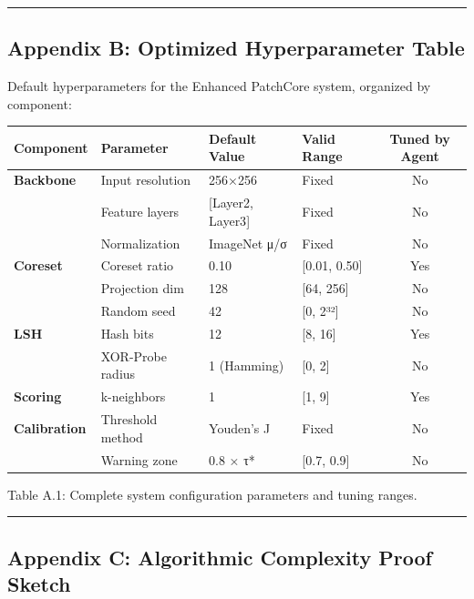 \begin{center}\rule{0.5\linewidth}{0.5pt}\end{center}

\subsection{Appendix B: Optimized Hyperparameter Table}\label{appendix-b-optimized-hyperparameter-table}

Default hyperparameters for the Enhanced PatchCore system, organized by component:

\begin{longtable}[]{@{}llllc@{}}
\toprule\noalign{}
Component & Parameter & Default Value & Valid Range & Tuned by Agent \\
\midrule\noalign{}
\endhead
\bottomrule\noalign{}
\endlastfoot
\textbf{Backbone} & Input resolution & 256×256 & Fixed & No \\
& Feature layers & {[}Layer2, Layer3{]} & Fixed & No \\
& Normalization & ImageNet μ/σ & Fixed & No \\
\textbf{Coreset} & Coreset ratio & 0.10 & {[}0.01, 0.50{]} & Yes \\
& Projection dim & 128 & {[}64, 256{]} & No \\
& Random seed & 42 & {[}0, 2³²{]} & No \\
\textbf{LSH} & Hash bits & 12 & {[}8, 16{]} & Yes \\
& XOR-Probe radius & 1 (Hamming) & {[}0, 2{]} & No \\
\textbf{Scoring} & k-neighbors & 1 & {[}1, 9{]} & Yes \\
\textbf{Calibration} & Threshold method & Youden's J & Fixed & No \\
& Warning zone & 0.8 × τ* & {[}0.7, 0.9{]} & No \\
\end{longtable}

Table A.1: Complete system configuration parameters and tuning ranges.

\begin{center}\rule{0.5\linewidth}{0.5pt}\end{center}

\subsection{Appendix C: Algorithmic Complexity Proof Sketch}\label{appendix-c-algorithmic-complexity-proof-sketch}

